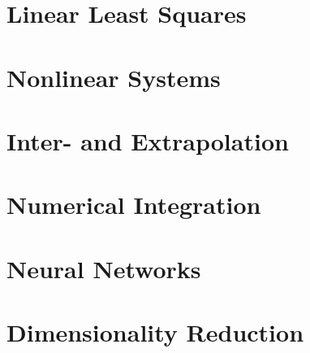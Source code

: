 \begin{multicols*}{4}

\section{Linear Least Squares}
    
    

\section{Nonlinear Systems}
    
    
    
    
\section{Inter- and Extrapolation}
    
    

\section{Numerical Integration}
    
    
    
    

\section{Neural Networks}
    
    
    
\section{Dimensionality Reduction}
    
\end{multicols*}     

